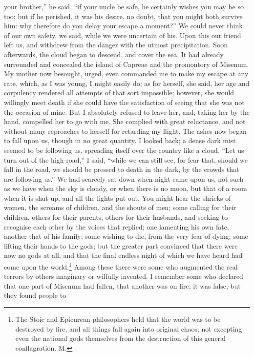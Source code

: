 your brother,'' he said, ``if your uncle be safe, he certainly wishes you
may be so too; but if he perished, it was his desire, no doubt, that you
might both survive him: why therefore do you delay your escape a moment?''
We could never think of our own safety, we said, while we were uncertain
of his. Upon this our friend left us, and withdrew from the danger with
the utmost precipitation. Soon afterwards, the cloud began to descend, and
cover the sea. It had already surrounded and concealed the island of
Capreae and the promontory of Misenum. My mother now besought, urged, even
commanded me to make my escape at any rate, which, as I was young, I might
easily do; as for herself, she said, her age and corpulency rendered all
attempts of that sort impossible; however, she would willingly meet death
if she could have the satisfaction of seeing that she was not the occasion
of mine. But I absolutely refused to leave her, and, taking her by the
hand, compelled her to go with me. She complied with great reluctance, and
not without many reproaches to herself for retarding my flight. The ashes
now began to fall upon us, though in no great quantity. I looked back; a
dense dark mist seemed to be following us, spreading itself over the
country like a cloud. ``Let us turn out of the high-road,'' I said, ``while
we can still see, for fear that, should we fall in the road, we should be
pressed to death in the dark, by the crowds that are following us.'' We had
scarcely sat down when night came upon us, not such as we have when the
sky is cloudy, or when there is no moon, but that of a room when it is
shut up, and all the lights put out. You might hear the shrieks of women,
the screams of children, and the shouts of men; some calling for their
children, others for their parents, others for their husbands, and seeking
to recognise each other by the voices that replied; one lamenting his own
fate, another that of his family; some wishing to die, from the very fear
of dying; some lifting their hands to the gods; but the greater part
convinced that there were now no gods at all, and that the final endless
night of which we have heard had come upon the world.\footnote{The Stoic and Epicurean
philosophers held that the world was to be destroyed by fire, and all
things fall again into original chaos; not excepting even the national
gods themselves from the destruction of this general conflagration. M.} Among these there were
some who augmented the real terrors by others imaginary or wilfully
invented. I remember some who declared that one part of Misenum had
fallen, that another was on fire; it was false, but they found people to
